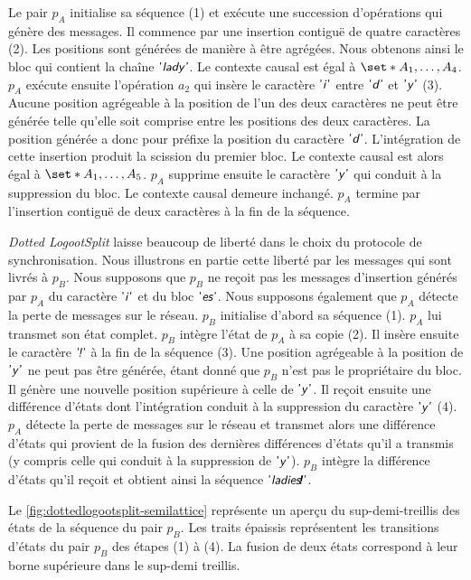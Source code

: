 Le pair $p_A$ initialise sa séquence (1) et exécute une succession d'opérations qui génère des messages.
Il commence par une insertion contiguë de quatre caractères (2).
Les positions sont générées de manière à être agrégées.
Nous obtenons ainsi le bloc qui contient la chaîne $\textsf{'\textit{lady}'}$.
Le contexte causal est égal à $\set*{A_1, \dotsc, A_4}$.
$p_A$ exécute ensuite l'opération $a_2$ qui insère le caractère $\textsf{'\textit{i}'}$ entre $\textsf{'\textit{d}'}$ et $\textsf{'\textit{y}'}$ (3).
Aucune position agrégeable à la position de l'un des deux caractères ne peut être générée telle qu'elle soit comprise entre les positions des deux caractères.
La position générée a donc pour préfixe la position du caractère $\textsf{'\textit{d}'}$.
L'intégration de cette insertion produit la scission du premier bloc.
Le contexte causal est alors égal à $\set*{A_1, \dotsc, A_5}$.
$p_A$ supprime ensuite le caractère $\textsf{'\textit{y}'}$ qui conduit à la suppression du bloc.
Le contexte causal demeure inchangé.
$p_A$ termine par l'insertion contiguë de deux caractères à la fin de la séquence.

\emph{Dotted LogootSplit} laisse beaucoup de liberté dans le choix du protocole de synchronisation.
Nous illustrons en partie cette liberté par les messages qui sont livrés à $p_B$.
Nous supposons que $p_B$ ne reçoit pas les messages d'insertion générés par $p_A$ du caractère $\textsf{'\textit{i}'}$ et du bloc $\textsf{'\textit{es}'}$.
Nous supposons également que $p_A$ détecte la perte de messages sur le réseau.
$p_B$ initialise d'abord sa séquence (1).
$p_A$ lui transmet son état complet.
$p_B$ intègre l'état de $p_A$ à sa copie (2).
Il insère ensuite le caractère $\textsf{'\textit{\negthinspace!}'}$ à la fin de la séquence (3).
Une position agrégeable à la position de $\textsf{'\textit{y}'}$ ne peut pas être générée, étant donné que $p_B$ n'est pas le propriétaire du bloc.
Il génère une nouvelle position supérieure à celle de $\textsf{'\textit{y}'}$.
Il reçoit ensuite une différence d'états dont l'intégration conduit à la suppression du caractère $\textsf{'\textit{y}'}$ (4).
$p_A$ détecte la perte de messages sur le réseau et transmet alors une différence d'états qui provient de la fusion des dernières différences d'états qu'il a transmis (y compris celle qui conduit à la suppression de  $\textsf{'\textit{y}'}$).
$p_B$ intègre la différence d'états qu'il reçoit et obtient ainsi la séquence $\textsf{'\textit{ladies\textbf{\negthinspace!}}'}$.

Le \autoref{fig:dottedlogootsplit-semilattice} représente un aperçu du sup-demi-treillis des états de la séquence du pair $p_B$.
Les traits épaissis représentent les transitions d'états du pair $p_B$ des étapes (1) à (4).
La fusion de deux états correspond à leur borne supérieure dans le sup-demi treillis.

